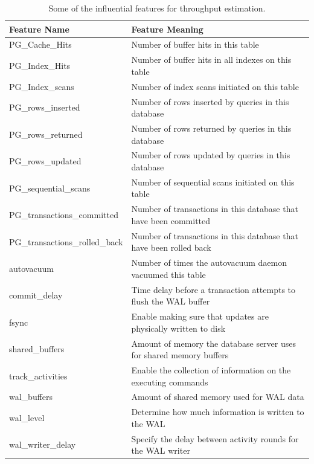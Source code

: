 \begin{table}[h!]
  \centering
  \begin{adjustbox}{max width=\linewidth}
    \begin{tabular}{ll}
      \toprule
      Feature Name                   & Feature Meaning                                                     \\
      \midrule
      PG\_Cache\_Hits                & Number of buffer hits in this table                                 \\
      PG\_Index\_Hits                & Number of buffer hits in all indexes on this table                  \\
      PG\_Index\_scans               & Number of index scans initiated on this
      table                       \\
      PG\_rows\_inserted             & Number of rows inserted by queries in this database                 \\
      PG\_rows\_returned             & Number of rows returned by queries in this database                 \\
      PG\_rows\_updated              & Number of rows updated by queries in this database                  \\
      PG\_sequential\_scans          & Number of sequential scans initiated on this table                  \\
      PG\_transactions\_committed    & Number of transactions in this database that have been committed    \\
      PG\_transactions\_rolled\_back & Number of transactions in this database that have been rolled back  \\
      autovacuum                     & Number of times the autovacuum daemon vacuumed this table           \\
      commit\_delay                  & Time delay before a transaction attempts to flush the WAL buffer    \\
      fsync                          & Enable making sure that updates are physically written to disk      \\
      shared\_buffers                & Amount of memory the database server uses for shared memory buffers \\
      track\_activities              & Enable the collection of information on the executing commands      \\
      wal\_buffers                   & Amount of shared memory used for WAL data                           \\
      wal\_level                     & Determine how much information is written to the WAL                \\
      wal\_writer\_delay             & Specify the delay between activity rounds for the WAL writer        \\
      \bottomrule
    \end{tabular}
  \end{adjustbox}

  \caption{Some of the influential features for throughput estimation.}
  \label{tab:influential_features_for_throughput}
\end{table}

